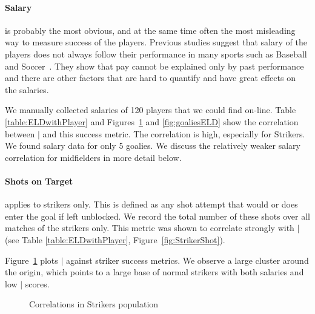 {	\paragraph{Salary} is probably the most obvious, and at the same time often the most misleading way to measure success of the players. Previous studies suggest that salary of the players does not  always follow their performance in many sports such as Baseball and Soccer~\cite{Hall2002,Barrio2004}. They show that pay cannot be explained only by past performance and there are other factors that are hard to quantify and have great effects on the salaries. 
	
	 We manually collected salaries of 120 players that we could find on-line. Table \ref{table:ELDwithPlayer}  and Figures~\ref{fig:strikersELD} and \ref{fig:goaliesELD} show the correlation between $\mid$ and this success metric. The correlation is high, especially for Strikers. We found salary data for only 5 goalies. We discuss the relatively weaker salary correlation for midfielders in more detail below.
	 
	 \paragraph{Shots on Target} applies to strikers only. This is defined as any shot attempt that would or does enter the goal if left unblocked. We record the total number of these shots over all matches of the strikers only. This metric was shown to correlate strongly with $\mid$ (see Table \ref{table:ELDwithPlayer}, Figure~\ref{fig:StrikerShot}).
	 
	 Figure~\ref{fig:strikersELD} plots $\mid$ against striker success metrics. We observe a large cluster around the origin, which points to a large base of normal strikers with both salaries and low $\mid$ scores. %
	 


	\begin{figure}
		\centering     %
		\caption{Correlations in Strikers population\label{fig:strikersELD}}
	\end{figure}


}
